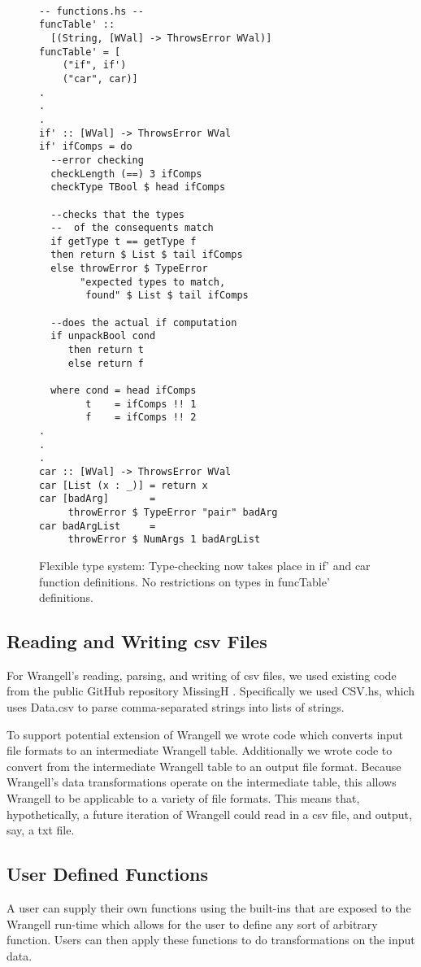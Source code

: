 \documentclass[preprint,nocopyrightspace]{sig-alternate}
\begin{document}
\begin{figure}
\caption{Flexible type system: Type-checking now takes place in if' and car function definitions. No restrictions on types in funcTable' definitions.}
\begin{lstlisting}

-- functions.hs --
funcTable' :: 
  [(String, [WVal] -> ThrowsError WVal)]
funcTable' = [  
    ("if", if')
    ("car", car)]
.
.
.
if' :: [WVal] -> ThrowsError WVal 
if' ifComps = do
  --error checking
  checkLength (==) 3 ifComps
  checkType TBool $ head ifComps

  --checks that the types 
  --  of the consequents match
  if getType t == getType f
  then return $ List $ tail ifComps
  else throwError $ TypeError 
       "expected types to match, 
        found" $ List $ tail ifComps

  --does the actual if computation
  if unpackBool cond 
     then return t 
     else return f

  where cond = head ifComps
        t    = ifComps !! 1
        f    = ifComps !! 2
.
.
.
car :: [WVal] -> ThrowsError WVal
car [List (x : _)] = return x
car [badArg]       = 
     throwError $ TypeError "pair" badArg
car badArgList     = 
     throwError $ NumArgs 1 badArgList

\end{lstlisting} 
\label{fig:flexType}
\end{figure}

\subsection{Reading and Writing csv Files}
For Wrangell's reading, parsing, and writing of csv files, we used  existing code from the public GitHub repository MissingH \cite{dataCSV}. Specifically we used CSV.hs, which uses Data.csv to parse comma-separated strings into lists of strings. 

To support potential extension of Wrangell we wrote code which converts input file formats to an intermediate Wrangell table. Additionally we wrote code to convert from the intermediate Wrangell table to an output file format. Because Wrangell's data transformations operate on the intermediate table, this allows Wrangell to be applicable to a variety of file formats. This means that, hypothetically, a future iteration of Wrangell could read in a csv file, and output, say, a txt file. 

\subsection{User Defined Functions}
A user can supply their own functions using the built-ins that are exposed to the Wrangell run-time which allows for the user to define any sort of arbitrary function. Users can then apply these functions to do transformations on the input data.
\begin{comment}
TODO: Show an example Wrangell function definition
\end{comment}
\end{document}
